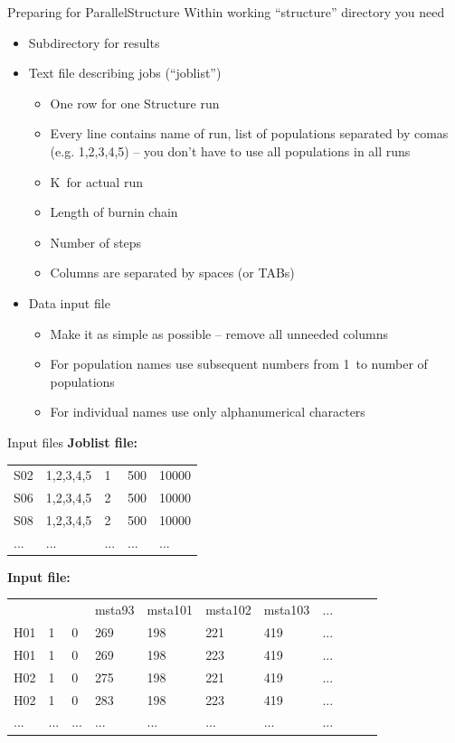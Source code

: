 \documentclass[compress, ucs, xelatex, 11pt, xcolor=svgnames,
  hyperref={
    bookmarks=true,
    unicode=true,
    colorlinks=true,
    pdftitle={Molecular data in R},
    plainpages=false,
    pdfauthor={Vojtech Zeisek},
    pdfsubject={Course about phylogeny and evolution in R},
    pdfcreator={XeLaTeX},
    pdfkeywords={R, evolution, phylogeny, molecular data},
    linkcolor=Tomato,
    anchorcolor=SaddleBrown,
    citecolor=Goldenrod,
    filecolor=DarkMagenta,
    menucolor=Sienna,
    urlcolor=DarkTurquoise,
    pdftex},
  url={hyphens, lowtilde} %
  ]{beamer}
\begin{document}
\begin{frame}{Preparing for ParallelStructure}
Within working ``structure'' directory you need
\begin{itemize}
 \item Subdirectory for results
 \item Text file describing jobs (``joblist'')
  \begin{itemize}
    \item One row for one Structure run
    \item Every line contains name of run, list of populations separated by comas (e.g. 1,2,3,4,5) -- you don't have to use all populations in all runs
    \item K~for actual run
    \item Length of burnin chain
    \item Number of steps
    \item Columns are separated by spaces (or TABs)
  \end{itemize}
 \item Data input file
  \begin{itemize}
    \item Make it as simple as possible -- remove all unneeded columns
    \item For population names use subsequent numbers from 1~to number of populations
    \item For individual names use only alphanumerical characters
  \end{itemize}
\end{itemize}
\end{frame}

\begin{frame}[fragile]{Input files}
\textbf{Joblist file:}\\
\vfill
\begin{tabular}{lllll}
S02 & 1,2,3,4,5 & 1 & 500 & 10000\\
S06 & 1,2,3,4,5 & 2 & 500 & 10000\\
S08 & 1,2,3,4,5 & 2 & 500 & 10000\\
... & ... & ... & ... & ...\\
\end{tabular}
\vfill
\textbf{Input file:}\\
\vfill
\begin{tabular}{lllllllllll}
 & & & msta93 & msta101 & msta102 & msta103 & ...\\
H01 & 1 & 0 & 269 & 198 & 221 & 419 & ...\\
H01 & 1 & 0 & 269 & 198 & 223 & 419 & ...\\
H02 & 1 & 0 & 275 & 198 & 221 & 419 & ...\\
H02 & 1 & 0 & 283 & 198 & 223 & 419 & ...\\
... & ... & ... & ... & ... & ... & ... & ...
\end{tabular}
\end{frame}
\end{document}

